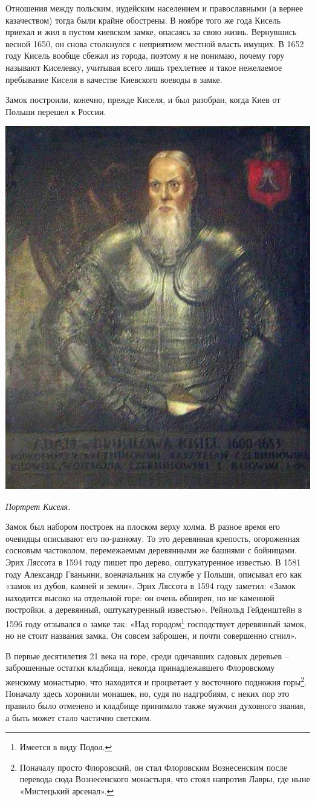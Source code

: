 Отношения между польским, иудейским населением и православными (а вернее казачеством) тогда были крайне обострены. В ноябре того же года Кисель приехал и жил в пустом киевском замке, опасаясь за свою жизнь. Вернувшись весной 1650, он снова столкнулся с неприятием местной власть имущих. В 1652 году Кисель вообще сбежал из города, поэтому я не понимаю, почему гору называют Киселевку, учитывая всего лишь трехлетнее и такое нежелаемое пребывание Киселя в качестве Киевского воеводы в замке.
 
Замок построили, конечно, прежде Киселя, и был разобран, когда Киев от Польши перешел к России.

\begin{center}
\includegraphics[width=0.40\linewidth]{chast-colebanie-osnov/gora-zamkovaya-valovaya/adam_kisiel.jpg}

\textit{Портрет Киселя.}
\end{center}

Замок был набором построек на плоском верху холма. В разное время его очевидцы описывают его по-разному. То это деревянная крепость, огороженная сосновым частоколом, перемежаемым деревянными же башнями с бойницами. Эрих Ляссота в 1594 году пишет про дерево, оштукатуренное известью. В 1581 году Александр Гваньини, военачальник на службе у Польши, описывал его как «замок из дубов, камней и земли». Эрих Ляссота в 1594 году заметил: «Замок находится высоко на отдельной горе: он очень обширен, но не каменной постройки, а деревянный, оштукатуренный известью». Рейнольд Гейденштейн в 1596 году отзывался о замке так: «Над городом\footnote{Имеется в виду Подол.} господствует деревянный замок, но не стоит названия замка. Он совсем заброшен, и почти совершенно сгнил».

В первые десятилетия 21 века на горе, среди одичавших садовых деревьев – заброшенные остатки кладбища, некогда принадлежавшего Флоровскому женскому монастырю, что находится и процветает у восточного подножия горы\footnote{Поначалу просто Флоровский, он стал Флоровским Вознесенским после перевода сюда Вознесенского монастыря, что стоял напротив Лавры, где ныне «Мистецький арсенал».}. Поначалу здесь хоронили монашек, но, судя по надгробиям, с неких пор это правило было отменено и кладбище принимало также мужчин духовного звания, а быть может стало частично светским.

